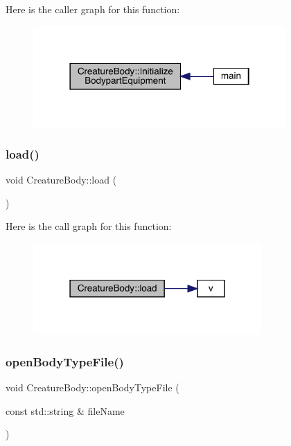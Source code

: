 Here is the caller graph for this function\+:
\nopagebreak
\begin{figure}[H]
\begin{center}
\leavevmode
\includegraphics[width=273pt]{da/d7d/class_creature_body_af2b152c045862bb0fbc370b444bf98f0_icgraph}
\end{center}
\end{figure}
\mbox{\label{class_creature_body_a947efb646a893964de6244b886bab038}} 
\subsubsection{\texorpdfstring{load()}{load()}}
{\footnotesize\ttfamily void Creature\+Body\+::load (\begin{DoxyParamCaption}{ }\end{DoxyParamCaption})}

Here is the call graph for this function\+:
\nopagebreak
\begin{figure}[H]
\begin{center}
\leavevmode
\includegraphics[width=247pt]{da/d7d/class_creature_body_a947efb646a893964de6244b886bab038_cgraph}
\end{center}
\end{figure}
\mbox{\label{class_creature_body_ac4140e081c8970ad4330c253c615ba33}} 
\subsubsection{\texorpdfstring{open\+Body\+Type\+File()}{openBodyTypeFile()}}
{\footnotesize\ttfamily void Creature\+Body\+::open\+Body\+Type\+File (\begin{DoxyParamCaption}\item[{const std\+::string \&}]{file\+Name }\end{DoxyParamCaption})}


